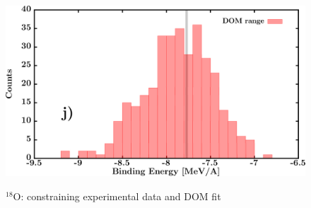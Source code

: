 \documentclass[twocolumn,secnumarabic,amssymb, nobibnotes, aps, prl,
superscriptaddress, nobalancelastpage, draft]{revtex4}
\newcommand{\oEight}{\ensuremath{^{18}}O}
\begin{document}
\begin{figure}[!htb]
\begin{minipage}{0.4\linewidth}
        \label{DOM_o18_RMSRadius}
    \end{minipage}\hspace{6pt}
    \begin{minipage}{0.4\linewidth}
        \centering
        \includegraphics[width=\linewidth]{figures/o18_BE.png}
        \label{DOM_o18_BE}
    \end{minipage}
    \caption{\oEight: constraining experimental data and DOM fit}
    \label{DOM_o18_structural}
\end{figure}
\end{document}

